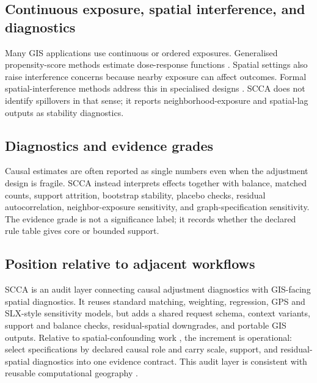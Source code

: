 \documentclass{article}
\begin{document}
\subsection{Continuous exposure, spatial interference, and diagnostics}

Many GIS applications use continuous or ordered exposures. Generalised propensity-score methods estimate dose-response functions \citep{hirano2004gps,zhao2020nonbinary}. Spatial settings also raise interference concerns because nearby exposure can affect outcomes. Formal spatial-interference methods address this in specialised designs \citep{verbitskysavitz2012,aronow2017interference,forastiere2021interference,giffin2023gpsinterference,papadogeorgou2022causal}. SCCA does not identify spillovers in that sense; it reports neighborhood-exposure and spatial-lag outputs as stability diagnostics.

\subsection{Diagnostics and evidence grades}

Causal estimates are often reported as single numbers even when the adjustment design is fragile. SCCA instead interprets effects together with balance, matched counts, support attrition, bootstrap stability, placebo checks, residual autocorrelation, neighbor-exposure sensitivity, and graph-specification sensitivity. The evidence grade is not a significance label; it records whether the declared rule table gives core or bounded support.

\subsection{Position relative to adjacent workflows}

SCCA is an audit layer connecting causal adjustment diagnostics with GIS-facing spatial diagnostics. It reuses standard matching, weighting, regression, GPS and SLX-style sensitivity models, but adds a shared request schema, context variants, support and balance checks, residual-spatial downgrades, and portable GIS outputs. Relative to spatial-confounding work \citep{hodges2010adding,paciorek2010importance,dupont2022spatial+,khan2022restricted,gilbert2021spatialconfounding,tec2023spatialdml}, the increment is operational: select specifications by declared causal role and carry scale, support, and residual-spatial diagnostics into one evidence contract. This audit layer is consistent with reusable computational geography \citep{nuest2021reproducible,konkol2019computational,brunsdon2016quantitative}.
\end{document}
